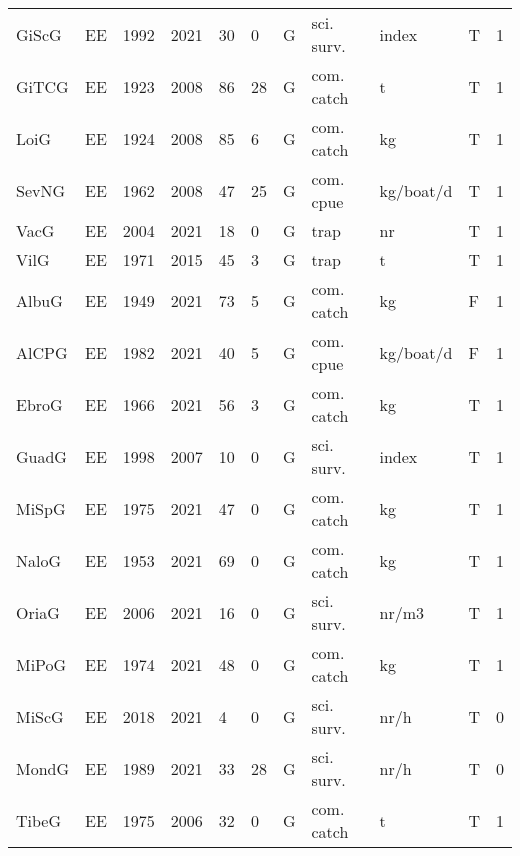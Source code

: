 \begin{table}[ht]
\begin{tabular}{p{1cm}p{1cm}p{1cm}p{1cm}p{0.8cm}p{0.8cm}p{1cm}p{2cm}p{2cm}p{1cm}p{1cm}}
  GiScG & EE & 1992 & 2021 & 30 & 0 & G & sci. surv. & index & T & 1 \\ 
  GiTCG & EE & 1923 & 2008 & 86 & 28 & G & com. catch & t & T & 1 \\ 
  LoiG & EE & 1924 & 2008 & 85 & 6 & G & com. catch & kg & T & 1 \\ 
  SevNG & EE & 1962 & 2008 & 47 & 25 & G & com. cpue & kg/boat/d & T & 1 \\ 
  VacG & EE & 2004 & 2021 & 18 & 0 & G & trap & nr & T & 1 \\ 
  VilG & EE & 1971 & 2015 & 45 & 3 & G & trap & t & T & 1 \\ 
  AlbuG & EE & 1949 & 2021 & 73 & 5 & G & com. catch & kg & F & 1 \\ 
  AlCPG & EE & 1982 & 2021 & 40 & 5 & G & com. cpue & kg/boat/d & F & 1 \\ 
  EbroG & EE & 1966 & 2021 & 56 & 3 & G & com. catch & kg & T & 1 \\ 
  GuadG & EE & 1998 & 2007 & 10 & 0 & G & sci. surv. & index & T & 1 \\ 
  MiSpG & EE & 1975 & 2021 & 47 & 0 & G & com. catch & kg & T & 1 \\ 
  NaloG & EE & 1953 & 2021 & 69 & 0 & G & com. catch & kg & T & 1 \\ 
  OriaG & EE & 2006 & 2021 & 16 & 0 & G & sci. surv. & nr/m3 & T & 1 \\ 
  MiPoG & EE & 1974 & 2021 & 48 & 0 & G & com. catch & kg & T & 1 \\ 
  MiScG & EE & 2018 & 2021 & 4 & 0 & G & sci. surv. & nr/h & T & 0 \\ 
  MondG & EE & 1989 & 2021 & 33 & 28 & G & sci. surv. & nr/h & T & 0 \\ 
  TibeG & EE & 1975 & 2006 & 32 & 0 & G & com. catch & t & T & 1 \\ 
   \hline
\end{tabular}
\end{table}
